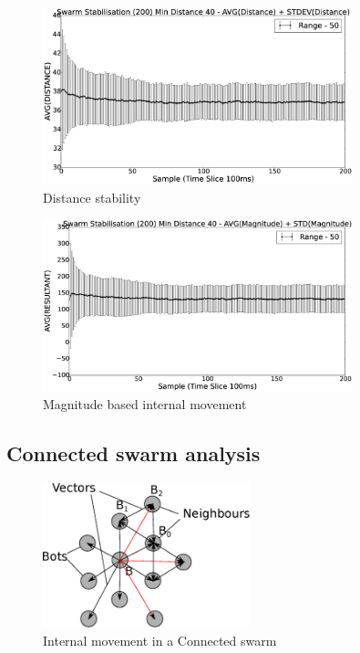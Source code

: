 \documentclass[10pt,journal,letterpaper,twoside]{IEEEtran}
\newcommand{\swarmB}{Connected}
\newcommand{\stability}{internal movement}
\newcommand{\Stability}{Internal movement}
\begin{document}
\begin{figure}[H]
\begin{center}
\includegraphics[width=9cm]{figures/StabilityDistanceSwarm40-50}
\end{center}
\caption{Distance stability\label{methods:StabilityDistanceSwarm40-50}}
\end{figure}

\begin{figure}[H]
\begin{center}
\includegraphics[width=9cm]{figures/StabilityMagnitudeSwarm40-50}
\end{center}
\caption{Magnitude based \stability{}\label{methods:StabilityMagnitudeSwarm40-50}}
\end{figure}

\subsection{\swarmB{} swarm analysis}

\begin{figure}[H]
\begin{center}
\includegraphics[width=6cm]{figures/CrushedStability}
\end{center}
\caption{\Stability{} in a \swarmB{} swarm} \label{methods:CrushedStability1}
\end{figure}
\end{document}
